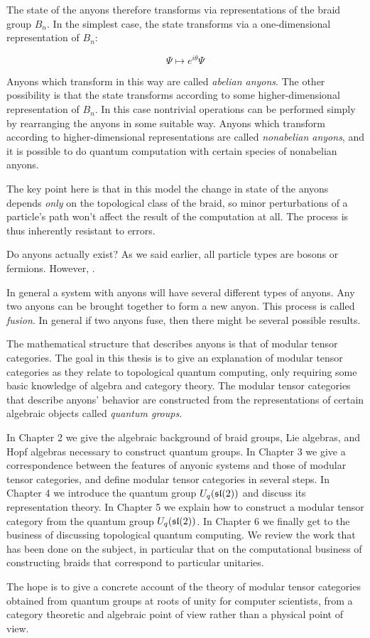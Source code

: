 The state of the anyons therefore transforms via representations of the braid
group $B_n$. In the simplest case, the state transforms via a one-dimensional
representation of $B_n$:

\begin{equation}
\Psi \mapsto e^{i\theta}\Psi
\end{equation}

Anyons which transform in this way are called \emph{abelian anyons}. The other
possibility is that the state transforms according to some higher-dimensional
representation of $B_n$. In this case nontrivial operations can be performed
simply by rearranging the anyons in some suitable way. Anyons which transform
according to higher-dimensional representations are called \emph{nonabelian
anyons}, and it is possible to do quantum computation with certain species
of nonabelian anyons.

The key point here is that in this model the change in state of the anyons
depends \emph{only} on the topological class of the braid, so minor
perturbations of a particle's path won't affect the result of the computation
at all. The process is thus inherently resistant to errors. 

Do anyons actually exist? As we said earlier, all particle types are bosons or
fermions. However, .

In general a system with anyons will have several different types of anyons.
Any two anyons can be brought together to form a new anyon. This process is
called \emph{fusion}. In general if two anyons fuse, then there might be
several possible results. 

The mathematical structure that describes anyons is that of modular tensor
categories. The goal in this thesis is to give an explanation of modular tensor
categories as they relate to topological quantum computing, only requiring some
basic knowledge of algebra and category theory. The modular tensor categories
that describe anyons' behavior are constructed from the representations of
certain algebraic objects called \emph{quantum groups}.



In Chapter 2 we give the algebraic background of braid groups, Lie algebras,
and Hopf algebras necessary to construct quantum groups. In Chapter 3 we give a
correspondence between the features of anyonic systems and those of modular
tensor categories, and define modular tensor categories in several steps.  In
Chapter 4 we introduce the quantum group $U_q(\mathfrak{sl}(2))$ and discuss its
representation theory. In
Chapter 5 we explain how to construct a modular tensor category from the
quantum group $U_q(\mathfrak{sl}(2))$. In Chapter 6 we finally get to the business of
discussing topological quantum computing. We review the work that has been done
on the subject, in particular that on the computational business of
constructing braids that correspond to particular unitaries. 

The hope is to give a concrete account of the theory of modular tensor
categories obtained from quantum groups at roots of unity for computer
scientists, from a category theoretic and algebraic point of view rather than a
physical point of view. 
